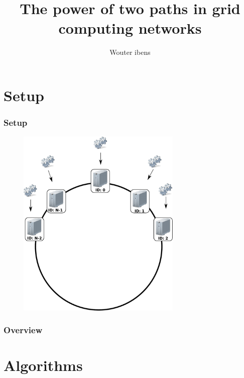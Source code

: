 \documentclass[compress]{beamer}
\title{The power of two paths in grid computing networks}
\author{Wouter ibens}
\begin{document}
\maketitle

\section{Setup}
\begin{frame}
\frametitle{Setup}
\begin{figure}[h!tb]
\centering
\includegraphics[width=0.7\textwidth,clip=true,trim=0px 225px 0px 0px]{../resources/drawing.pdf}
\end{figure}
\end{frame}

\begin{frame}
\frametitle{Overview}
\tableofcontents
\end{frame}

\section{Algorithms}
\end{document}
